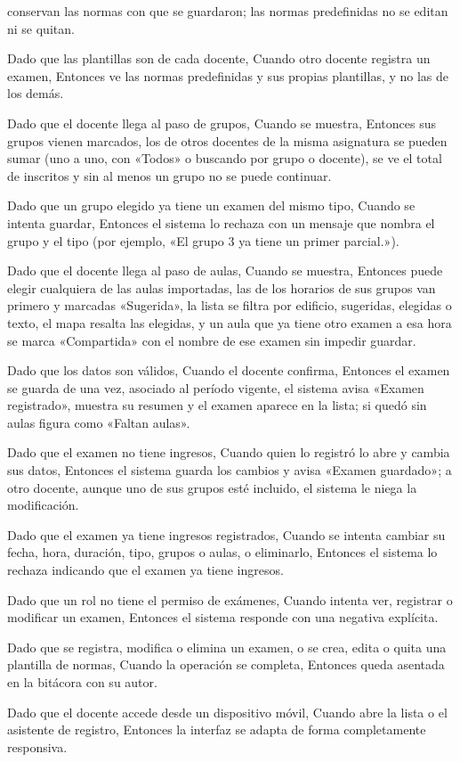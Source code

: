 {      conservan las normas con que se guardaron; las normas predefinidas no se editan
      ni se quitan.
\item Dado que las plantillas son de cada docente, Cuando otro docente registra un
      examen, Entonces ve las normas predefinidas y sus propias plantillas, y no las de
      los demás.
\item Dado que el docente llega al paso de grupos, Cuando se muestra, Entonces sus grupos
      vienen marcados, los de otros docentes de la misma asignatura se pueden sumar (uno a
      uno, con «Todos» o buscando por grupo o docente), se ve el total de inscritos y sin
      al menos un grupo no se puede continuar.
\item Dado que un grupo elegido ya tiene un examen del mismo tipo, Cuando se intenta
      guardar, Entonces el sistema lo rechaza con un mensaje que nombra el grupo y el
      tipo (por ejemplo, «El grupo 3 ya tiene un primer parcial.»).
\item Dado que el docente llega al paso de aulas, Cuando se muestra, Entonces puede elegir
      cualquiera de las aulas importadas, las de los horarios de sus grupos van primero y
      marcadas «Sugerida», la lista se filtra por edificio, sugeridas, elegidas o texto,
      el mapa resalta las elegidas, y un aula que ya tiene otro examen a esa hora se
      marca «Compartida» con el nombre de ese examen sin impedir guardar.
\item Dado que los datos son válidos, Cuando el docente confirma, Entonces el examen se
      guarda de una vez, asociado al período vigente, el sistema avisa «Examen
      registrado», muestra su resumen y el examen aparece en la lista; si quedó sin aulas
      figura como «Faltan aulas».
\item Dado que el examen no tiene ingresos, Cuando quien lo registró lo abre y cambia sus
      datos, Entonces el sistema guarda los cambios y avisa «Examen guardado»; a otro
      docente, aunque uno de sus grupos esté incluido, el sistema le niega la
      modificación.
\item Dado que el examen ya tiene ingresos registrados, Cuando se intenta cambiar su
      fecha, hora, duración, tipo, grupos o aulas, o eliminarlo, Entonces el sistema lo
      rechaza indicando que el examen ya tiene ingresos.
\item Dado que un rol no tiene el permiso de exámenes, Cuando intenta ver, registrar o
      modificar un examen, Entonces el sistema responde con una negativa explícita.
\item Dado que se registra, modifica o elimina un examen, o se crea, edita o quita una
      plantilla de normas, Cuando la operación se completa, Entonces queda asentada en la bitácora con su autor.
\item Dado que el docente accede desde un dispositivo móvil, Cuando abre la lista o el
      asistente de registro, Entonces la interfaz se adapta de forma completamente
      responsiva.}

